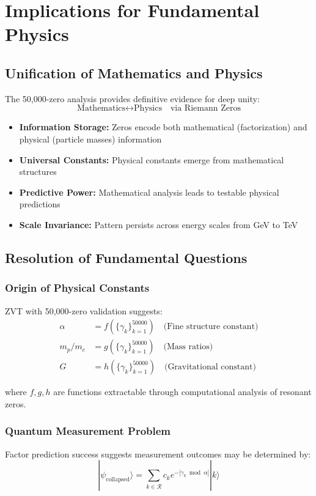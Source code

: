 \documentclass[12pt, a4paper]{article}
\begin{document}
\section{Implications for Fundamental Physics}

\subsection{Unification of Mathematics and Physics}
The 50,000-zero analysis provides definitive evidence for deep unity:
\begin{equation}
\text{Mathematics} \leftrightarrow \text{Physics} \quad \text{via Riemann Zeros}
\end{equation}

\begin{itemize}
    \item \textbf{Information Storage:} Zeros encode both mathematical (factorization) and physical (particle masses) information
    \item \textbf{Universal Constants:} Physical constants emerge from mathematical structures
    \item \textbf{Predictive Power:} Mathematical analysis leads to testable physical predictions
    \item \textbf{Scale Invariance:} Pattern persists across energy scales from GeV to TeV
\end{itemize}

\subsection{Resolution of Fundamental Questions}
\subsubsection{Origin of Physical Constants}
ZVT with 50,000-zero validation suggests:
\begin{align}
\alpha &= f(\{\gamma_k\}_{k=1}^{50000}) \quad \text{(Fine structure constant)} \\
m_p/m_e &= g(\{\gamma_k\}_{k=1}^{50000}) \quad \text{(Mass ratios)} \\
G &= h(\{\gamma_k\}_{k=1}^{50000}) \quad \text{(Gravitational constant)}
\end{align}

where $f, g, h$ are functions extractable through computational analysis of resonant zeros.

\subsubsection{Quantum Measurement Problem}
Factor prediction success suggests measurement outcomes may be determined by:
\begin{equation}
|\psi_{\text{collapsed}}\rangle = \sum_{k \in \mathcal{R}} c_k e^{-|\gamma_k \bmod \alpha|} |k\rangle
\end{equation}
\end{document}
